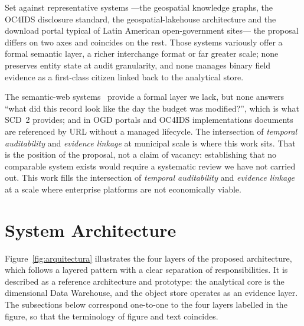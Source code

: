 \documentclass[runningheads]{llncs}
\renewcommand{\_}{\origunderscore\allowbreak}
\begin{document}
\begingroup
Set against representative systems ---the geospatial knowledge graphs, the OC4IDS disclosure standard, the geospatial-lakehouse architecture and the download portal typical of Latin American open-government sites--- the proposal differs on two axes and coincides on the rest. Those systems variously offer a formal semantic layer, a richer interchange format or far greater scale; none preserves entity state at audit granularity, and none manages binary field evidence as a first-class citizen linked back to the analytical store.

The semantic-web systems~\cite{Janowicz2022,Poveda2020,Rajabi2023} provide a formal layer we lack, but none answers ``what did this record look like the day the budget was modified?'', which is what SCD~2 provides; and in OGD portals and OC4IDS implementations documents are referenced by URL without a managed lifecycle. The intersection of \emph{temporal auditability} and \emph{evidence linkage} at municipal scale is where this work sits. That is the position of the proposal, not a claim of vacancy: establishing that no comparable system exists would require a systematic review we have not carried out. This work fills the intersection of \emph{temporal auditability} and \emph{evidence linkage} at a scale where enterprise platforms are not economically viable.
\endgroup


\section{System Architecture}
\label{sec:arquitectura}

Figure~\ref{fig:arquitectura} illustrates the four layers of the proposed architecture, which follows a layered pattern with a clear separation of responsibilities. It is described as a reference architecture and prototype: the analytical core is the dimensional Data Warehouse, and the object store operates as an evidence layer. The subsections below correspond one-to-one to the four layers labelled in the figure, so that the terminology of figure and text coincides.
\end{document}

